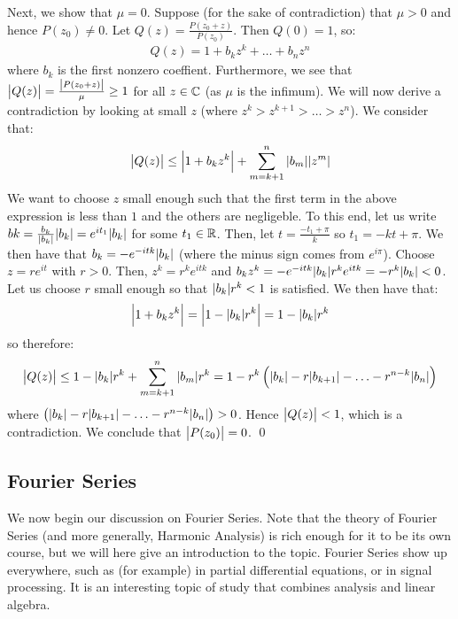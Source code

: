 \begin{nproof}
    Next, we show that $\mu = 0$. Suppose (for the sake of contradiction) that $\mu > 0$ and hence $P(z_0) \neq 0$. Let $Q(z) = \frac{P(z_0 + z)}{P(z_0)}$. Then $Q(0) = 1$, so:
    \begin{align*}
        Q(z) = 1 + b_kz^k + \ldots + b_nz^n
    \end{align*}
    where $b_k$ is the first nonzero coeffient. Furthermore, we see that $\abs{Q(z)} = \frac{\abs{P(z_0 + z)}}{\mu} \geq 1$ for all $z \in \mathbb{C}$ (as $\mu$ is the infimum). We will now derive a contradiction by looking at small $z$ (where $z^k > z^{k+1} > \ldots > z^n$). We consider that:
    \begin{align*}
        \abs{Q(z)} \leq \abs{1 + b_kz^k} + \sum_{m=k+1}^n \abs{b_m}\abs{z^m}
    \end{align*}
    We want to choose $z$ small enough such that the first term in the above expression is less than $1$ and the others are negligeble. To this end, let us write $bk = \frac{b_k}{\abs{b_k}}\abs{b_k} = e^{it_1}\abs{b_k}$ for some $t_1 \in \mathbb{R}$. Then, let $t = \frac{-t_1 + \pi}{k}$ so $t_1 = -kt + \pi$. We then have that $b_k = -e^{-itk}\abs{b_k}$ (where the minus sign comes from $e^{i\pi}$). Choose $z = re^{it}$ with $r > 0$. Then, $z^k = r^ke^{itk}$ and $b_kz^k = -e^{-itk}\abs{b_k}r^ke^{itk} = -r^k\abs{b_k} < 0$. Let us choose $r$ small enough so that $\abs{b_k}r^k < 1$ is satisfied. We then have that:
    \begin{align*}
        \abs{1 + b_kz^k} = \abs{1 - \abs{b_k}r^k} = 1 - \abs{b_k}r^k
    \end{align*}
    so therefore:
    \begin{align*}
        \abs{Q(z)} \leq 1 - \abs{b_k}r^k + \sum_{m=k+1}^n \abs{b_m}r^k = 1 - r^k\left(\abs{b_k} - r\abs{b_{k+1}} - \ldots - r^{n-k}\abs{b_n}\right)
    \end{align*}
    where $\left(\abs{b_k} - r\abs{b_{k+1}} - \ldots - r^{n-k}\abs{b_n}\right) > 0$. Hence $\abs{Q(z)} < 1$, which is a contradiction. We conclude that $\abs{P(z_0)} = 0$. \qed
\end{nproof}

\subsection{Fourier Series}
\noindent We now begin our discussion on Fourier Series. Note that the theory of Fourier Series (and more generally, Harmonic Analysis) is rich enough for it to be its own course, but we will here give an introduction to the topic. Fourier Series show up everywhere, such as (for example) in partial differential equations, or in signal processing. It is an interesting topic of study that combines analysis and linear algebra. 


